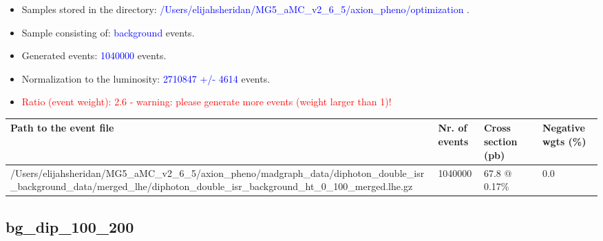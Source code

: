 \documentclass[a4paper, 10pt]{article}
\begin{document}
\begin{itemize}
  \item Samples stored in the directory: \textcolor{blue}{/\-Users/\-elijahsheridan/\-MG5\_aMC\_v2\_6\_5/\-axion\_pheno/\-optimization} .
   \item Sample consisting of: \textcolor{blue}{background}  events.
   \item Generated events: \textcolor{blue}{1040000 }  events.
   \item Normalization to the luminosity: \textcolor{blue}{2710847}\textcolor{blue}{ +/\-- }\textcolor{blue}{4614 }  events.
   \item\textcolor{red}{Ratio (event weight): }\textcolor{red}{2.6 }\textcolor{red}{ - warning: please generate more events (weight larger than 1)!}
\textcolor{red}{}
\end{itemize}
\begin{table}[H]
  \begin{center}
    \begin{tabular}{|m{55.0mm}|m{25.0mm}|m{30.0mm}|m{30.0mm}|}
      \hline
      {\cellcolor{yellow}         Path to the event file}& {\cellcolor{yellow}         Nr. of events}& {\cellcolor{yellow}         Cross section (pb)}& {\cellcolor{yellow}         Negative wgts (\%)}\\
      \hline
      {\cellcolor{white}          /\-Users/\-elijahsheridan/\-MG5\_aMC\_v2\_6\_5/\-axion\_pheno/\-madgraph\_data/\-diphoton\_double\_isr\_background\_data/\-merged\_lhe/\-diphoton\_double\_isr\_background\_ht\_0\_100\_merged.lhe.gz}& {\cellcolor{white}          1040000}& {\cellcolor{white}          67.8 @ 0.17\%}& {\cellcolor{white}          0.0}\\
\hline
    \end{tabular}
  \end{center}
\end{table}

\subsection{ bg\_dip\_100\_200}
\end{document}
